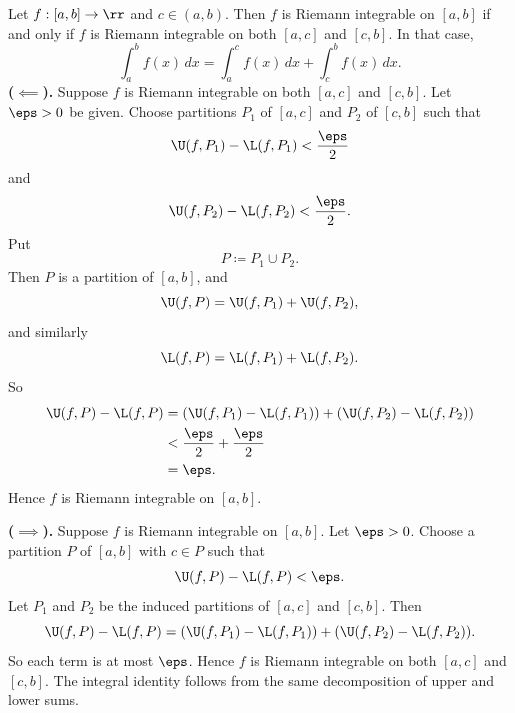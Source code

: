 \begin{theorem}{
    Let $f:[a,b]\to\rr$ and $c\in(a,b)$.
    Then $f$ is Riemann integrable on $[a,b]$ if and only if $f$ is Riemann integrable on both $[a,c]$ and $[c,b]$.
    In that case,
    \[
        \int_a^b f(x)\,dx=\int_a^c f(x)\,dx+\int_c^b f(x)\,dx.
    \]
}
	\textbf{($\impliedby$).}
    Suppose $f$ is Riemann integrable on both $[a,c]$ and $[c,b]$.
    Let $\eps > 0$ be given.
    Choose partitions $P_1$ of $[a,c]$ and $P_2$ of $[c,b]$ such that
    \[
        \U(f,P_1)-\L(f,P_1)<\frac{\eps}{2}
    \]
    and
    \[
        \U(f,P_2)-\L(f,P_2)<\frac{\eps}{2}.
    \]
    Put
    \[
        P\coloneqq P_1\cup P_2.
    \]
    Then $P$ is a partition of $[a,b]$, and
    \[
        \U(f,P)=\U(f,P_1)+\U(f,P_2),
    \]
    and similarly
    \[
        \L(f,P)=\L(f,P_1)+\L(f,P_2).
    \]
    So
    \begin{align*}
        \U(f,P)-\L(f,P)
        &= (\U(f,P_1)-\L(f,P_1)) + (\U(f,P_2)-\L(f,P_2))\\
        &< \frac{\eps}{2}+\frac{\eps}{2}\\
        &= \eps.
    \end{align*}
    Hence $f$ is Riemann integrable on $[a,b]$.

    \textbf{($\implies$).}
    Suppose $f$ is Riemann integrable on $[a,b]$.
    Let $\eps > 0$.
    Choose a partition $P$ of $[a,b]$ with $c\in P$ such that
    \[
        \U(f,P)-\L(f,P)<\eps.
    \]
    Let $P_1$ and $P_2$ be the induced partitions of $[a,c]$ and $[c,b]$.
    Then
    \[
        \U(f,P)-\L(f,P)
        =
        (\U(f,P_1)-\L(f,P_1))
        +
        (\U(f,P_2)-\L(f,P_2)).
    \]
    So each term is at most $\eps$.
    Hence $f$ is Riemann integrable on both $[a,c]$ and $[c,b]$.
    The integral identity follows from the same decomposition of upper and lower sums.
\end{theorem}